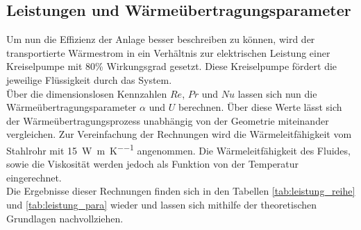 \subsection{Leistungen und Wärmeübertragungsparameter}
Um nun die Effizienz der Anlage besser beschreiben zu können, wird der transportierte Wärmestrom in ein Verhältnis zur elektrischen Leistung einer Kreiselpumpe mit 80\% Wirkungsgrad gesetzt. Diese Kreiselpumpe fördert die jeweilige Flüssigkeit durch das System.\\
Über die dimensionslosen Kennzahlen $Re$, $Pr$ und $Nu$ lassen sich nun die Wärmeübertragungsparameter $\alpha $ und $U$ berechnen. Über diese Werte lässt sich der Wärmeübertragungsprozess unabhängig von der Geometrie miteinander vergleichen. Zur Vereinfachung der Rechnungen wird die Wärmeleitfähigkeit vom Stahlrohr mit \SI{15}{\watt\per\meter \per\kelvin} angenommen. Die Wärmeleitfähigkeit des Fluides, sowie die Viskosität werden jedoch als Funktion von der Temperatur eingerechnet.\\
Die Ergebnisse dieser Rechnungen finden sich in den Tabellen \ref{tab:leistung_reihe} und \ref{tab:leistung_para} wieder und lassen sich mithilfe der theoretischen Grundlagen nachvollziehen.
\begin{table}[h!]
	\centering
	\caption{Berechnete Leistungen, dimensionslose Kennzahlen und \linebreak Wärmeübertragungsparameter der Reihenschaltung}
	\label{tab:leistung_reihe}
\end{table}%
